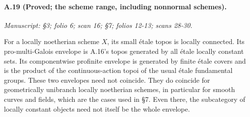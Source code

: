 \paragraph{A.19 (Proved; the scheme range, including nonnormal schemes).}
\textit{Manuscript: \S 3; folio 6; scan 16; \S 7; folios 12-13; scans 28-30.}

For a locally noetherian scheme $X$, its small étale topos is locally connected. Its pro-multi-Galois envelope is A.16's topos generated by all étale locally constant sets. Its componentwise profinite envelope is generated by finite étale covers and is the product of the continuous-action topoi of the usual étale fundamental groups. These two envelopes need not coincide. They do coincide for geometrically unibranch locally noetherian schemes, in particular for smooth curves and fields, which are the cases used in \S7. Even there, the subcategory of locally constant objects need not itself be the whole envelope.
